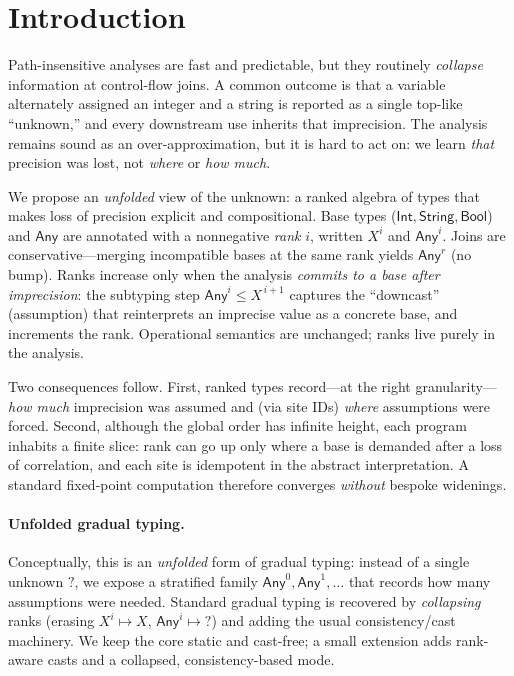 \section{Introduction}

Path-insensitive analyses are fast and predictable, but they routinely \emph{collapse} information at control-flow joins.
A common outcome is that a variable alternately assigned an integer and a string is reported as a single top-like “unknown,” and every downstream use inherits that imprecision.
The analysis remains sound as an over-approximation, but it is hard to act on: we learn \emph{that} precision was lost, not \emph{where} or \emph{how much}.

We propose an \emph{unfolded} view of the unknown: a ranked algebra of types that makes loss of precision explicit and compositional.
Base types (\(\mathsf{Int},\mathsf{String},\mathsf{Bool}\)) and \(\mathsf{Any}\) are annotated with a nonnegative \emph{rank} \(i\), written \(X^{i}\) and \(\mathsf{Any}^{i}\).
Joins are conservative—merging incompatible bases at the same rank yields \(\mathsf{Any}^{r}\) (no bump).
Ranks increase only when the analysis \emph{commits to a base after imprecision}:
the subtyping step \(\mathsf{Any}^{i} \le X^{\,i+1}\) captures the “downcast” (assumption) that reinterprets an imprecise value as a concrete base, and increments the rank.
Operational semantics are unchanged; ranks live purely in the analysis.

Two consequences follow.
First, ranked types record—at the right granularity—\emph{how much} imprecision was assumed and (via site IDs) \emph{where} assumptions were forced.
Second, although the global order has infinite height, each program inhabits a finite slice:
rank can go up only where a base is demanded after a loss of correlation, and each site is idempotent in the abstract interpretation.
A standard fixed-point computation therefore converges \emph{without} bespoke widenings.

\paragraph{Unfolded gradual typing.}
Conceptually, this is an \emph{unfolded} form of gradual typing: instead of a single unknown \(?\), we expose a stratified family \(\mathsf{Any}^{0},\mathsf{Any}^{1},\ldots\) that records how many assumptions were needed.
Standard gradual typing is recovered by \emph{collapsing} ranks (erasing \(X^{i}\mapsto X\), \(\mathsf{Any}^{i}\mapsto ?\)) and adding the usual consistency/cast machinery.
We keep the core static and cast-free; a small extension adds rank-aware casts and a collapsed, consistency-based mode.

